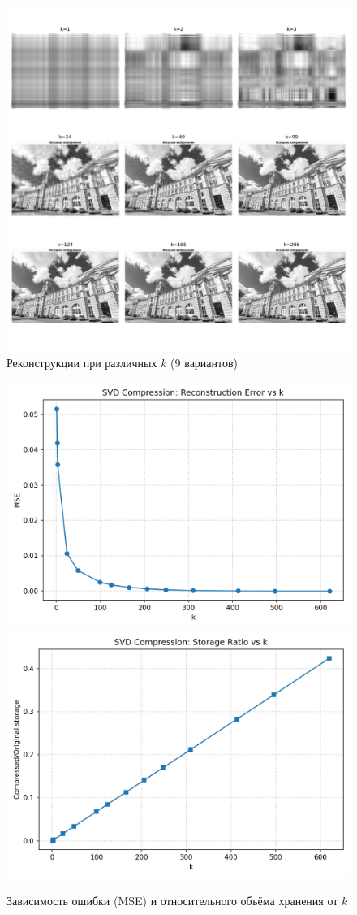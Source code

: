 \begin{figure}[h!]
  \centering
  \includegraphics[width=0.95\linewidth]{images/task1/svd_grid.png}
  \caption{Реконструкции при различных \(k\) (9 вариантов)}
  \label{fig:svd-grid}
\end{figure}

\begin{figure}[h!]
  \centering
  \includegraphics[width=0.48\linewidth]{images/task1/svd_mse_vs_k.png}\hfill
  \includegraphics[width=0.48\linewidth]{images/task1/svd_storage_ratio_vs_k.png}
  \caption{Зависимость ошибки (MSE) и относительного объёма хранения от \(k\)}
  \label{fig:svd-metrics}
\end{figure}

